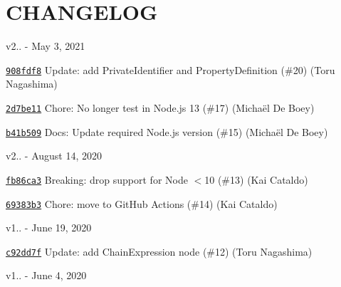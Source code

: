 \chapter{CHANGELOG}
\hypertarget{md_node__modules_2_0dbabel_2eslint-parser_2node__modules_2eslint-visitor-keys_2CHANGELOG}{}\label{md_node__modules_2_0dbabel_2eslint-parser_2node__modules_2eslint-visitor-keys_2CHANGELOG}
v2.. -\/ May 3, 2021


\begin{DoxyItemize}
\item \href{https://github.com/eslint/eslint-visitor-keys/commit/908fdf8c0d9a352c696c8c1f4901280d1a0795f7}{\texttt{ {\ttfamily 908fdf8}}} Update\+: add Private\+Identifier and Property\+Definition (\#20) (Toru Nagashima)
\item \href{https://github.com/eslint/eslint-visitor-keys/commit/2d7be11e4d13ac702c9fe3c529cadbd75b370146}{\texttt{ {\ttfamily 2d7be11}}} Chore\+: No longer test in Node.\+js 13 (\#17) (Michaël De Boey)
\item \href{https://github.com/eslint/eslint-visitor-keys/commit/b41b509b153ecd8d47af46a421122f64e93d4c67}{\texttt{ {\ttfamily b41b509}}} Docs\+: Update required Node.\+js version (\#15) (Michaël De Boey)
\end{DoxyItemize}

v2.. -\/ August 14, 2020


\begin{DoxyItemize}
\item \href{https://github.com/eslint/eslint-visitor-keys/commit/fb86ca315daafc84e23ed9005db40b0892b972a6}{\texttt{ {\ttfamily fb86ca3}}} Breaking\+: drop support for Node \texorpdfstring{$<$}{<}10 (\#13) (Kai Cataldo)
\item \href{https://github.com/eslint/eslint-visitor-keys/commit/69383b372915e33ada094880ecc6b6e8f8c7ca4e}{\texttt{ {\ttfamily 69383b3}}} Chore\+: move to Git\+Hub Actions (\#14) (Kai Cataldo)
\end{DoxyItemize}

v1.. -\/ June 19, 2020


\begin{DoxyItemize}
\item \href{https://github.com/eslint/eslint-visitor-keys/commit/c92dd7ff96f0044dba12d681406a025b92b4c437}{\texttt{ {\ttfamily c92dd7f}}} Update\+: add {\ttfamily Chain\+Expression} node (\#12) (Toru Nagashima)
\end{DoxyItemize}

v1.. -\/ June 4, 2020


